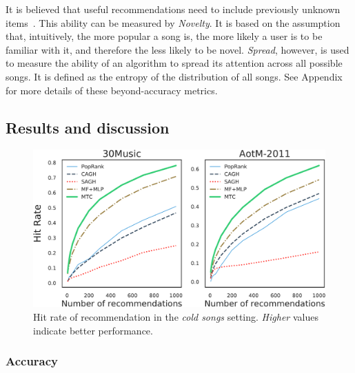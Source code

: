 It is believed that
useful recommendations need to include previously unknown items~\cite{herlocker2004evaluating,zhang2012auralist}.
This ability can be measured by \emph{Novelty}.
It is based on the assumption that, intuitively, the more popular a song is, 
the more likely a user is to be familiar with it, and therefore the less likely to be novel.
%
\emph{Spread}, however, is used to measure the ability of an algorithm to spread its attention across all possible songs.
It is defined as the entropy of the distribution of all songs.
See Appendix for more details of these beyond-accuracy metrics.


\subsection{Results and discussion}

\begin{figure}[!t]
    \centering
    \includegraphics[width=\columnwidth]{fig/hr1.pdf}
    \caption{Hit rate of recommendation in the \emph{cold songs} setting.
\emph{Higher} values indicate better performance.}
    \label{fig:hr1}
\end{figure}



\subsubsection{Accuracy}

